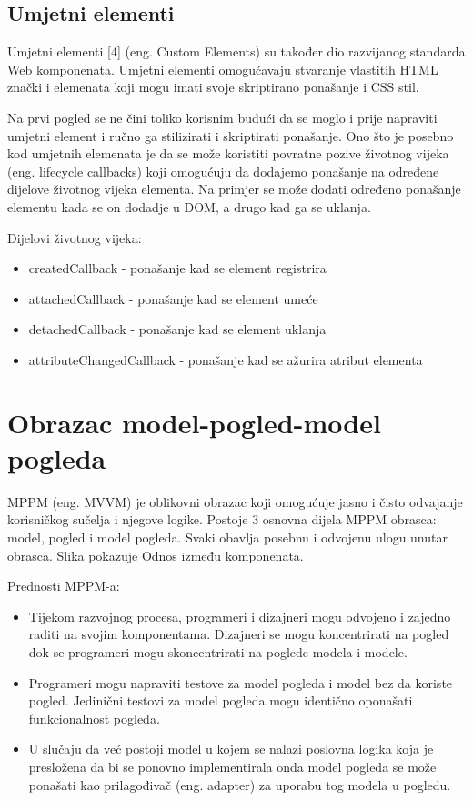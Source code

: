 \documentclass[times, utf8, zavrsni]{fer}
\begin{document}
\subsection{Umjetni elementi}
Umjetni elementi [4] (eng. Custom Elements) su također dio razvijanog standarda Web komponenata. Umjetni elementi omogućavaju stvaranje vlastitih HTML znački i elemenata koji mogu imati svoje skriptirano ponašanje i CSS stil.

Na prvi pogled se ne čini toliko korisnim budući da se moglo i prije napraviti umjetni element i ručno ga stilizirati i skriptirati ponašanje. Ono što je posebno kod umjetnih elemenata je da se može koristiti povratne pozive životnog vijeka (eng. lifecycle callbacks) koji omogućuju da dodajemo ponašanje na određene dijelove životnog vijeka elementa. Na primjer se može dodati određeno ponašanje elementu kada se on dodadje u DOM, a drugo kad ga se uklanja.

Dijelovi životnog vijeka:
\begin{itemize}
\item createdCallback - ponašanje kad se element registrira
\item attachedCallback - ponašanje kad se element umeće
\item detachedCallback - ponašanje kad se element uklanja
\item attributeChangedCallback - ponašanje kad se ažurira atribut elementa
\end{itemize}

\section{Obrazac model-pogled-model pogleda}
MPPM (eng. MVVM) je oblikovni obrazac koji omogućuje jasno i čisto odvajanje korisničkog sučelja i njegove logike. 
Postoje 3 osnovna dijela MPPM obrasca: model, pogled i model pogleda. Svaki obavlja posebnu i odvojenu ulogu unutar obrasca. Slika pokazuje Odnos između komponenata.

Prednosti MPPM-a:
\begin{itemize}
\item Tijekom razvojnog procesa, programeri i dizajneri mogu odvojeno i zajedno raditi na svojim komponentama. Dizajneri se mogu koncentrirati na pogled dok se programeri mogu skoncentrirati na poglede modela i modele.
\item Programeri mogu napraviti testove za model pogleda i model bez da koriste pogled. Jedinični testovi za model pogleda mogu identično oponašati funkcionalnost pogleda.
\item U slučaju da već postoji model u kojem se nalazi poslovna logika koja je presložena da bi se ponovno implementirala onda model pogleda se može ponašati kao prilagođivač (eng. adapter) za uporabu tog modela u pogledu.
\end{itemize}
\end{document}
